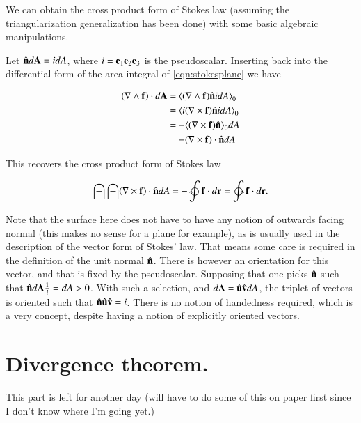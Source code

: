 \documentclass{article}
\newcommand{\grad}[0]{\nabla}
\newcommand{\gpgrade}[2] {{\left\langle{{#1}}\right\rangle}_{#2}}
\newcommand{\gpgradezero}[1] {\gpgrade{#1}{0}}
\begin{document}
We can obtain the  cross product form of Stokes law (assuming the triangularization generalization has been
done) with some basic algebraic manipulations.

Let $\hat{\mathbf{n}} d\mathbf{A} = i dA$, where $i = \mathbf{e}_1\mathbf{e}_2\mathbf{e}_3$ is the  pseudoscalar.  Inserting back into 
the differential form of the area integral of \ref{eqn:stokesplane} we have

\begin{align*}
\left(\grad \wedge \Bf\right) \cdot d\BA
&= \gpgradezero{ (\grad \wedge \Bf) \ncap i dA} \\
&= \gpgradezero{ i (\grad \cross \Bf) \ncap i dA} \\
&= -\gpgradezero{ (\grad \cross \Bf) \ncap } dA \\
&= - (\grad \cross \Bf) \cdot \ncap dA \\
\end{align*}

This recovers the cross product form of Stokes law

\begin{equation}
\int\int (\grad \cross \Bf) \cdot \ncap dA = - \ointclockwise \Bf \cdot d\Br = \ointctrclockwise \Bf \cdot d\Br.
\end{equation}

Note that the surface here does not have to have any notion of outwards facing normal (this makes no sense for a plane for example), as is usually used
in the description of the  vector form of Stokes' law.
That means some care is required in the definition of the unit normal $\hat{\mathbf{n}}$.
There is however an orientation for this vector, and that is fixed by the
pseudoscalar.  Supposing that one picks $\hat{\mathbf{n}}$ such that $\hat{\mathbf{n}} d\mathbf{A} \frac{1}{i} = dA > 0$.  With such a selection, and
$d\mathbf{A} = \hat{\mathbf{u}} \hat{\mathbf{v}} dA$, the triplet of vectors is oriented such that $\hat{\mathbf{n}} \hat{\mathbf{u}} \hat{\mathbf{v}} = i$.  There
is no notion of handedness required, which is a very  concept, despite having a notion of
explicitly oriented vectors.

\section{ Divergence theorem. }

This part is left for another day (will have to do some of this on paper first since I don't know where I'm going
yet.)
\end{document}
